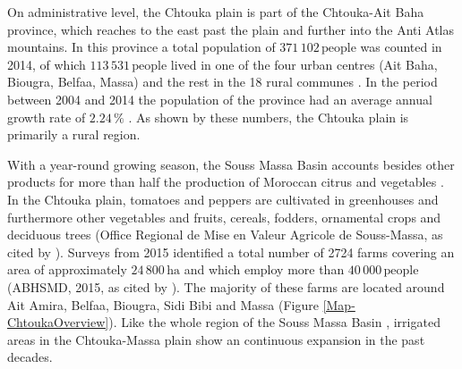 On administrative level, the Chtouka plain is part of the Chtouka-Ait Baha province, which reaches to the east past the plain and further into the Anti Atlas mountains. 
In this province a total population of $371 \, 102 \, \textrm{people}$ was counted in 2014, of which $113 \, 531 \, \textrm{people}$ lived in one of the four urban centres (Ait Baha, Biougra, Belfaa, Massa) and the rest in the 18 rural communes \parencite{DRSM.2020}. 
In the period between 2004 and 2014 the population of the province had an average annual growth rate of $2.24 \, \%$ \parencite{DRSM.2020}. 
As shown by these numbers, the Chtouka plain is primarily a rural region.

With a year-round growing season, the Souss Massa Basin accounts besides other products for more than half the production of Moroccan citrus and vegetables \parencite{Hssaisoune.2017}. 
In the Chtouka plain, tomatoes and peppers are cultivated in greenhouses \parencite{DRSM.2020} and furthermore other vegetables and fruits, cereals, fodders, ornamental crops and deciduous trees (Office Regional de Mise en Valeur Agricole de Souss-Massa, as cited by \cite{Malki.2017}). 
Surveys from 2015 identified a total number of 2724 farms covering an area of approximately $24\,800 \, \textrm{ha}$ and which employ more than $40\,000 \, \textrm{people}$ (ABHSMD, 2015, as cited by \cite{Choukr.2017}). 
The majority of these farms are located around Ait Amira, Belfaa, Biougra, Sidi Bibi and Massa (Figure \ref{Map-ChtoukaOverview}). 
Like the whole region of the Souss Massa Basin \parencite{Choukr.2017}, irrigated areas in the Chtouka-Massa plain show an continuous expansion in the past decades.

